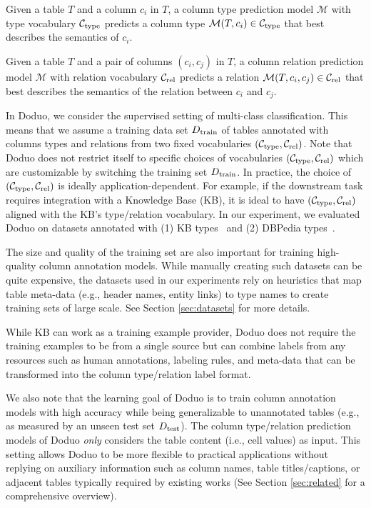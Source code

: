 \documentclass[sigconf]{acmart}
\newcommand{\name}{\mbox{\sc Doduo}}
\newcommand{\rev}[1]{#1}
\begin{document}
\rev{
\begin{problem}
Given a table $T$ and a column $c_i$ in $T$,
a column type prediction model $\mathcal{M}$ 
with type vocabulary $\mathcal{C}_{\rm{type}}$
predicts a column type
$\mathcal{M}(T, c_i) \in \mathcal{C}_{\rm{type}}$
that best describes the semantics of $c_i$.
\end{problem}

{
\begin{problem}[Column relation prediction]
Given a table $T$ and a pair of columns
$(c_i, c_j)$ in $T$, 
a column relation prediction model $\mathcal{M}$
with relation vocabulary $\mathcal{C}_{\rm{rel}}$
predicts a relation
$\mathcal{M}(T, c_i, c_j) \in \mathcal{C}_{\rm{rel}}$ that best describes the semantics of the relation between $c_i$ and $c_j$.
\end{problem}
}
}

\rev{
In \name{}, we consider the supervised setting of 
multi-class classification. This means that we assume
a training data set $D_{\rm{train}}$ of tables 
annotated with columns types and relations from two fixed vocabularies
$(\mathcal{C}_{\rm{type}}, \mathcal{C}_{\rm{rel}})$.
Note that \name{} does not restrict itself to specific choices of vocabularies 
$(\mathcal{C}_{\rm{type}}, \mathcal{C}_{\rm{rel}})$ which are customizable by
switching the training set $D_{\rm{train}}$.
In practice, the choice of $(\mathcal{C}_{\rm{type}}, \mathcal{C}_{\rm{rel}})$ 
is ideally application-dependent. For example, if the downstream task
requires integration with a Knowledge Base (KB), it is ideal to have 
$(\mathcal{C}_{\rm{type}}, \mathcal{C}_{\rm{rel}})$ aligned with the KB's type/relation vocabulary.
In our experiment, we evaluated \name{} on datasets annotated with 
(1) KB types~\cite{bollacker2008freebase} and (2) DBPedia types~\cite{Nguyen:2020:MTab4DBPedia}.

The size and quality of the training set are 
also important for training high-quality 
column annotation models. While manually 
creating such datasets can be quite expensive, 
the datasets used in our experiments rely on 
heuristics that map table meta-data 
(e.g., header names, entity links)
to type names to create training sets
of large scale. See Section \ref{sec:datasets}
for more details.

While KB can work as a training example provider, \name{} does not require the training examples to be from a single source but can combine labels from any resources such as human annotations, labeling rules, and meta-data that can be transformed into the column type/relation label format.


We also note that the learning goal of \name{} is to train
column annotation models with high accuracy while being generalizable to unannotated tables (e.g., as measured by an unseen test set $D_{\rm{test}}$).
The column type/relation prediction models of \name{}
\emph{only} considers the table content (i.e., cell values) as input. 
This setting allows \name{} to be more flexible to practical applications
without replying on auxiliary information such as column names, table titles/captions, 
or adjacent tables typically required by existing works 
(See Section \ref{sec:related} for a comprehensive overview).
}
\end{document}
